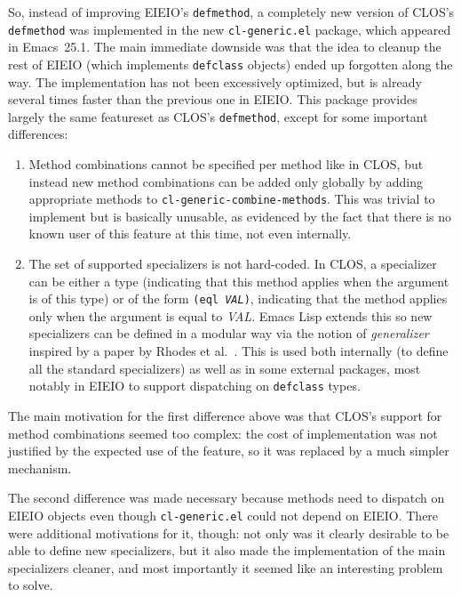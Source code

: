 \documentclass[format=acmsmall,screen]{acmart}
\newcommand \Elisp {Emacs Lisp}
\newcommand \id[1] {\textrm{\textsl{#1}}}
\begin{document}
So, instead of improving EIEIO's \texttt{defmethod}, a completely new
version of CLOS's \texttt{defmethod} was implemented in the new
\texttt{cl-generic.el} package, which appeared in Emacs~25.1.  The main
immediate downside was that the idea to cleanup the rest of EIEIO (which
implements \texttt{defclass} objects) ended up forgotten along the way.
The implementation has not been excessively optimized, but is already several times
faster than the previous one in EIEIO.  This package provides largely the
same featureset as CLOS's \texttt{defmethod}, except for some important
differences:
\begin{enumerate}
\item Method combinations cannot be specified per method like in CLOS, but
  instead new method combinations can be added only globally by adding
  appropriate methods to
  \texttt{cl-\linebreak[0]generic-\linebreak[0]combine-\linebreak[0]methods}.
  This was trivial to implement but is basically unusable, as
  evidenced by the fact that there is no known user of this feature at this
  time, not even internally.
\item The set of supported specializers is not hard-coded.  In CLOS,
  a specializer can be either a type (indicating that this method applies when the argument is of
  this type) or of the form \texttt{(eql \id{VAL})}, indicating that the
  method applies only when the argument is equal to \id{VAL}.
  \Elisp{} extends this so new specializers
  can be defined in a modular way via the notion of \emph{generalizer}
  inspired by a paper by Rhodes et al.~\cite{Rhodes14}.  This is used both internally (to define
  all the standard specializers) as well as in some external packages, most
  notably in EIEIO to support dispatching on \texttt{defclass} types.
\end{enumerate}
The main motivation for the first difference above was that CLOS's support
for method combinations seemed too complex: the cost of implementation was
not justified by the expected use of the feature, so it was replaced by
a much simpler mechanism.

The second difference was made necessary because methods need to dispatch
on EIEIO objects even though \texttt{cl-generic.el} could not depend on
EIEIO.  There were additional motivations for
it, though: not only was it clearly desirable to be able to define new
specializers, but it also made the implementation of the main specializers
cleaner, and most importantly it seemed like an interesting problem
to solve.
\end{document}

